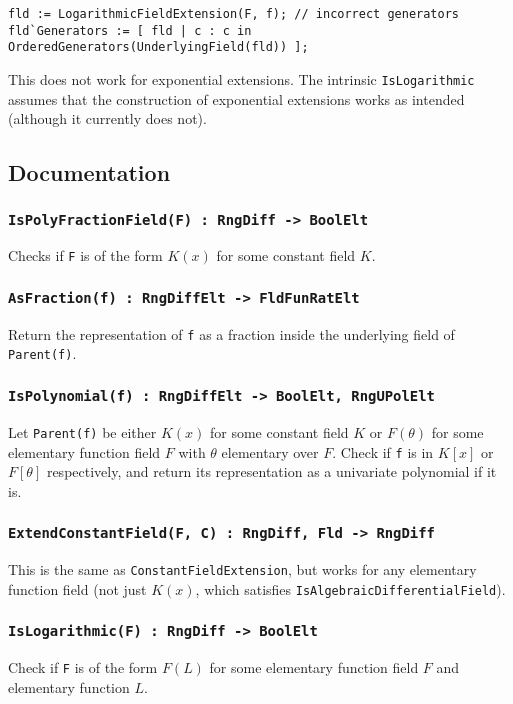 \documentclass{article}
\theoremstyle{plain}
\theoremstyle{definition}
\begin{document}
\begin{lstlisting}[numbers=none]
fld := LogarithmicFieldExtension(F, f); // incorrect generators
fld`Generators := [ fld | c : c in OrderedGenerators(UnderlyingField(fld)) ];
\end{lstlisting}

This does not work for exponential extensions. The intrinsic
\lstinline{IsLogarithmic} assumes that the construction of exponential extensions 
works as intended (although it currently does not).

\subsection{Documentation}

\subsubsection*{\lstinline{IsPolyFractionField(F) : RngDiff -> BoolElt}}
Checks if \lstinline{F} is of the form $K(x)$ for some constant field $K$.

\subsubsection*{\lstinline{AsFraction(f) : RngDiffElt -> FldFunRatElt}}
Return the representation of \lstinline{f} as a fraction inside the underlying
field of \lstinline{Parent(f)}.

\subsubsection*{\lstinline{IsPolynomial(f) : RngDiffElt -> BoolElt, RngUPolElt}}
Let \lstinline{Parent(f)} be either $K(x)$ for some constant field $K$ or
$F(\theta)$ for some elementary function field $F$ with $\theta$ elementary over
$F$. Check if \lstinline{f} is in $K[x]$ or $F[\theta]$ respectively, and return
its representation as a univariate polynomial if it is.

\subsubsection*{\lstinline{ExtendConstantField(F, C) : RngDiff, Fld -> RngDiff}}
This is the same as \lstinline{ConstantFieldExtension}, but works for any
elementary function field (not just $K(x)$, which satisfies
\lstinline{IsAlgebraicDifferentialField}).


\subsubsection*{\lstinline{IsLogarithmic(F) : RngDiff -> BoolElt}}
Check if \lstinline{F} is of the form $F(L)$ for some elementary function field
$F$ and elementary function $L$.
\end{document}
